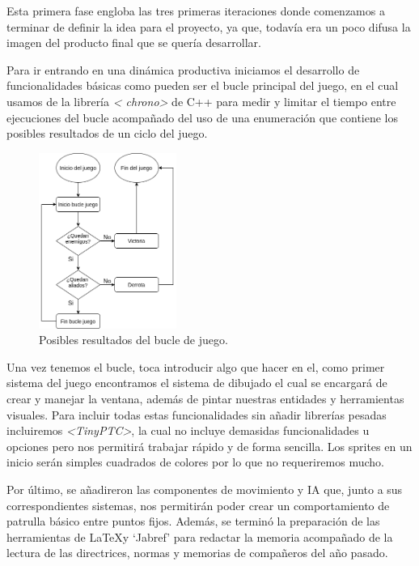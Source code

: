 Esta primera fase engloba las tres primeras iteraciones donde comenzamos a terminar de definir 
la idea para el proyecto, ya que, todavía era un poco difusa la imagen del producto final que se
quería desarrollar.

Para ir entrando en una dinámica productiva iniciamos el desarrollo de funcionalidades básicas 
como pueden ser el bucle principal del juego, en el cual usamos de la librería \textit{\textless
chrono\textgreater} de C++ para medir y limitar el tiempo entre ejecuciones del bucle acompañado del uso 
de una enumeración que contiene los posibles resultados de un ciclo del juego.

\begin{figure}[htb]
\centering
\includegraphics[width=0.4\textwidth]{imagenes/diario_desarrollo/Loop_juego.png}
\caption{Posibles resultados del bucle de juego.}
\label{fig:game_loop}
\end{figure} 

Una vez tenemos el bucle, toca introducir algo que hacer en el, como primer sistema del juego
encontramos el sistema de dibujado el cual se encargará de crear y manejar la ventana, además
de pintar nuestras entidades y herramientas visuales. Para incluir todas estas funcionalidades
sin añadir librerías pesadas incluiremos \textit{\textless TinyPTC\textgreater}, la cual no 
incluye demasidas funcionalidades u opciones pero nos permitirá trabajar rápido y de forma 
sencilla. Los sprites en un inicio serán simples cuadrados de colores por lo que no requeriremos 
mucho.

Por último, se añadireron las componentes de movimiento y \ac{IA} que, junto a sus correspondientes
sistemas, nos permitirán poder crear un comportamiento de patrulla básico entre puntos fijos.
Además, se terminó la preparación de las herramientas de \LaTeX y `Jabref' para redactar la 
memoria acompañado de la lectura de las directrices, normas y memorias de compañeros del año 
pasado.

